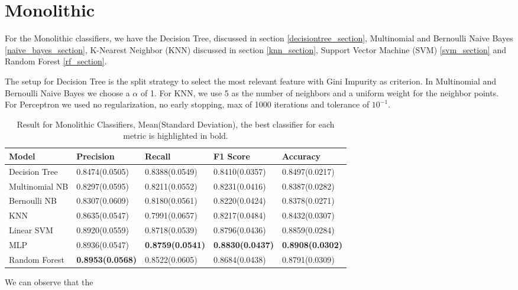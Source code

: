\section{Monolithic}\label{mono}

For the Monolithic classifiers, we have the Decision Tree, discussed in section \ref{decisiontree_section}, Multinomial and Bernoulli Naive Bayes \ref{naive_bayes_section}, K-Nearest Neighbor (KNN) discussed in section \ref{knn_section}, Support Vector Machine (SVM) \ref{svm_section} and Random Forest \ref{rf_section}.

The setup for Decision Tree is the split strategy to select the most relevant feature with Gini Impurity as criterion. In Multinomial and Bernoulli Naive Bayes we choose a $\alpha$ of 1. For KNN, we use 5 as the number of neighbors and a uniform weight for the neighbor points. For Perceptron we used no regularization, no early stopping, max of 1000 iterations and tolerance of $10^{-1}$.

\begin{table}[h!]
    \centering
    \renewcommand{\arraystretch}{1.8}
    \begin{tabular}{ |p{3cm}|p{2.6cm}p{2.6cm}p{2.6cm}p{2.6cm}| }
        \hline
        Model & Precision & Recall & F1 Score & Accuracy \\
        \hline
        Decision Tree & 0.8474(0.0505) & 0.8388(0.0549) & 0.8410(0.0357) & 0.8497(0.0217) \\
        Multinomial NB & 0.8297(0.0595) & 0.8211(0.0552) & 0.8231(0.0416) & 0.8387(0.0282) \\
        Bernoulli NB & 0.8307(0.0609) & 0.8180(0.0561) & 0.8220(0.0424) & 0.8378(0.0271) \\
        KNN & 0.8635(0.0547) & 0.7991(0.0657) & 0.8217(0.0484) & 0.8432(0.0307) \\
        Linear SVM & 0.8920(0.0559) & 0.8718(0.0539) & 0.8796(0.0436) & 0.8859(0.0284) \\
        MLP & 0.8936(0.0547) & \textbf{0.8759(0.0541)} & \textbf{0.8830(0.0437)} & \textbf{0.8908(0.0302)} \\
        Random Forest & \textbf{0.8953(0.0568)} & 0.8522(0.0605) & 0.8684(0.0438) & 0.8791(0.0309) \\ [1ex]
        \hline
        \end{tabular}
        \caption{%
        Result for Monolithic Classifiers, Mean(Standard Deviation), the best classifier for each metric is highlighted in bold.%
        }\label{mcs_perceptron_table}
\end{table}

We can observe that the     